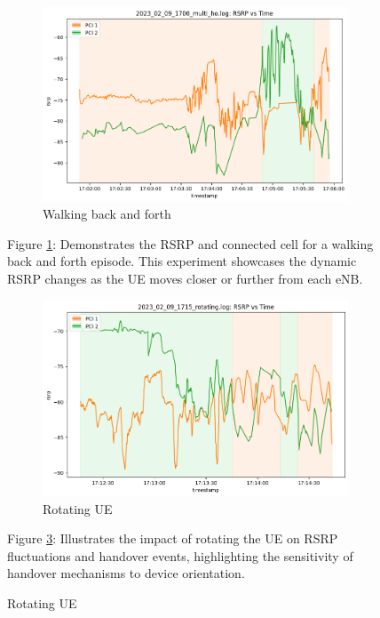 \begin{figure}[p]
    \vspace{1cm}
    \begin{minipage}{0.45\textwidth}
    \begin{subfigure}{.9\linewidth}
        \centering
        \includegraphics[width=0.9\linewidth]{src//img/2024_02_09_multiho.png}
        \caption{Walking back and forth}
        \label{fig:real:mobile:walk}
    \end{subfigure}
    \end{minipage}%
    \begin{minipage}{0.45\textwidth}
        \small{Figure \ref{fig:real:mobile:walk}: Demonstrates the RSRP and connected cell for a walking back and forth episode. This experiment showcases the dynamic RSRP changes as the UE moves closer or further from each eNB.}
    \end{minipage}
    
    \vspace{1cm}
    \begin{minipage}{0.45\textwidth}
    \begin{subfigure}{\linewidth}
        \centering
        \includegraphics[width=0.9\linewidth]{src//img/2024_02_09_rotating.png}
        \caption{Rotating UE}
        \label{fig:real:mobile:rotate}
    \end{subfigure}
    \end{minipage}
    \begin{minipage}{0.45\textwidth}
        \small{Figure \ref{fig:real:mobile:rotate}: Illustrates the impact of rotating the UE on RSRP fluctuations and handover events, highlighting the sensitivity of handover mechanisms to device orientation.}
    \end{minipage}
    

\end{figure}
